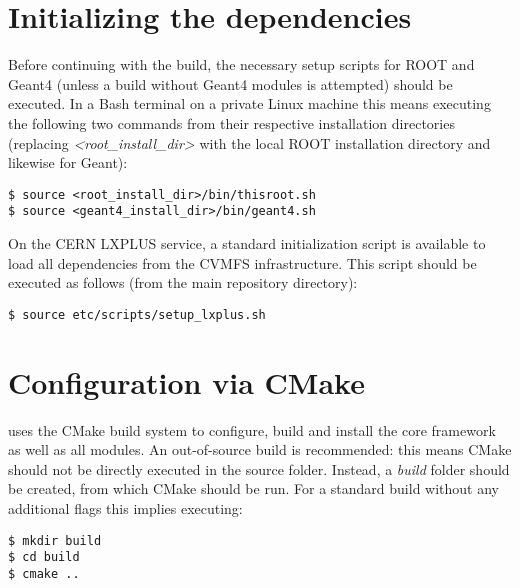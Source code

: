 \section{Initializing the dependencies}
\label{sec:initialize_dependencies}
Before continuing with the build, the necessary setup scripts for ROOT and Geant4 (unless a build without Geant4 modules is attempted) should be executed.
In a Bash terminal on a private Linux machine this means executing the following two commands from their respective installation directories (replacing \textit{\textless root\_install\_dir\textgreater} with the local ROOT installation directory and likewise for Geant):
\begin{verbatim}
$ source <root_install_dir>/bin/thisroot.sh
$ source <geant4_install_dir>/bin/geant4.sh
\end{verbatim}

On the CERN LXPLUS service, a standard initialization script is available to load all dependencies from the CVMFS infrastructure.
This script should be executed as follows (from the main repository directory):
\begin{verbatim}
$ source etc/scripts/setup_lxplus.sh
\end{verbatim}

\section{Configuration via CMake}
\label{sec:cmake_config}
\apsq uses the CMake build system to configure, build and install the core framework as well as all modules.
An out-of-source build is recommended: this means CMake should not be directly executed in the source folder.
Instead, a \textit{build} folder should be created, from which CMake should be run.
For a standard build without any additional flags this implies executing:

\begin{verbatim}
$ mkdir build
$ cd build
$ cmake ..
\end{verbatim}

